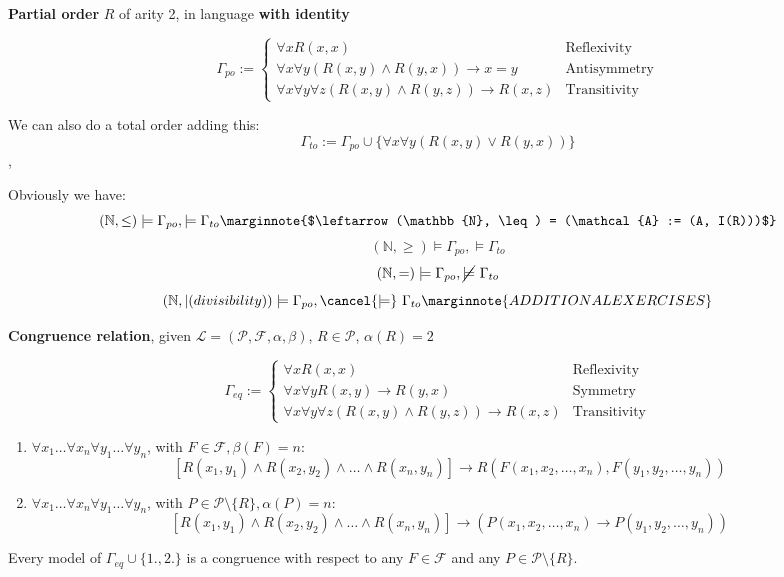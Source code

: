 \begin{example} \textbf{Partial order} $R$ of arity 2, in language \textbf{with identity}

$$
\Gamma_{po} := \begin{cases}
  	\forall x R(x,x) & \text{Reflexivity} \\
	\forall x \forall y (R(x,y) \wedge R(y,x)) \rightarrow x=y & \text{Antisymmetry} \\
	\forall x \forall y \forall z (R(x,y) \wedge R(y,z)) \rightarrow R(x,z) & \text{Transitivity}
\end{cases}
$$

\noindent
We can also do a total order adding this:
$$\Gamma_{to} := \Gamma_{po} \cup \{\forall x \forall y (R(x,y) \vee R(y,x))\} $$,

\noindent
Obviously we have:
$$(\mathbb{N}, \leq) \models \Gamma_{po}, \models \Gamma_{to}  \marginnote{$\leftarrow (\mathbb{N}, \leq) = (\mathcal{A} := (A, I(R)))$}$$
$$(\mathbb{N}, \geq) \models \Gamma_{po}, \models \Gamma_{to}$$
$$(\mathbb{N}, =) \models \Gamma_{po}, \cancel{\models} \ \Gamma_{to}$$
$$(\mathbb{N}, | (divisibility)) \models \Gamma_{po}, \cancel{\models} \ \Gamma_{to} \marginnote{ADDITIONAL EXERCISES}$$

\end{example}

\begin{example} \textbf{Congruence relation}, given $\mathcal{L}=(\mathcal{P},\mathcal{F},\alpha, \beta)$, $R \in \mathcal{P}$, $\alpha(R) = 2$

$$
\Gamma_{eq} := \begin{cases}
  	\forall x R(x,x) & \text{Reflexivity} \\
	\forall x \forall y R(x,y) \rightarrow R(y,x) & \text{Symmetry} \\
	\forall x \forall y \forall z (R(x,y) \wedge R(y,z)) \rightarrow R(x,z) & \text{Transitivity}
\end{cases}
$$

\begin{enumerate}
  \item $\forall x_{1} \dots \forall x_{n} \forall y_{1} \dots \forall y_{n}$, with $F \in \mathcal{F}, \beta(F) = n$:
		$$ [ R(x_{1},y_{1}) \wedge  R(x_{2},y_{2}) \wedge \dots \wedge  R(x_{n},y_{n}) ] \rightarrow R(F(x_{1}, x_{2}, \ldots, x_{n}), F(y_{1}, y_{2}, \ldots, y_{n}) ) $$
   \item $\forall x_{1} \dots \forall x_{n} \forall y_{1} \dots \forall y_{n}$, with $P \in \mathcal{P} \setminus \{R\}, \alpha(P) = n$:
		$$ [ R(x_{1},y_{1}) \wedge  R(x_{2},y_{2}) \wedge \dots \wedge  R(x_{n},y_{n}) ] \rightarrow (P(x_{1}, x_{2}, \ldots, x_{n}) \rightarrow P(y_{1}, y_{2}, \ldots, y_{n}))  $$
\end{enumerate}
Every model of $\Gamma_{eq} \cup \{1.,2.\}$ is a congruence with respect to any $F \in \mathcal{F}$ and any $P \in \mathcal{P} \setminus \{R\}$.

\end{example}

